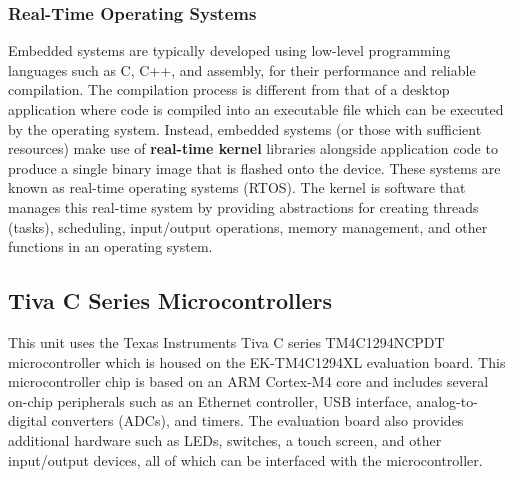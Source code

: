 \documentclass{article}
\begin{document}
\subsubsection{Real-Time Operating Systems}
Embedded systems are typically developed using low-level programming
languages such as C, C++, and assembly, for their performance and
reliable compilation. The compilation process is different from that of
a desktop application where code is compiled into an executable file
which can be executed by the operating system. Instead, embedded
systems (or those with sufficient resources) make use of
\textbf{real-time kernel} libraries alongside application code to
produce a single binary image that is flashed onto the device. These
systems are known as real-time operating systems (RTOS). The kernel is
software that manages this real-time system by providing abstractions
for creating threads (tasks), scheduling, input/output operations,
memory management, and other functions in an operating system.
\subsection{Tiva C Series Microcontrollers}
This unit uses the Texas Instruments Tiva C series TM4C1294NCPDT
microcontroller which is housed on the EK-TM4C1294XL evaluation board.
This microcontroller chip is based on an ARM Cortex-M4 core and
includes several on-chip peripherals such as an Ethernet controller,
USB interface, analog-to-digital converters (ADCs), and timers. The
evaluation board also provides additional hardware such as LEDs,
switches, a touch screen, and other input/output devices, all of which
can be interfaced with the microcontroller.
\end{document}
